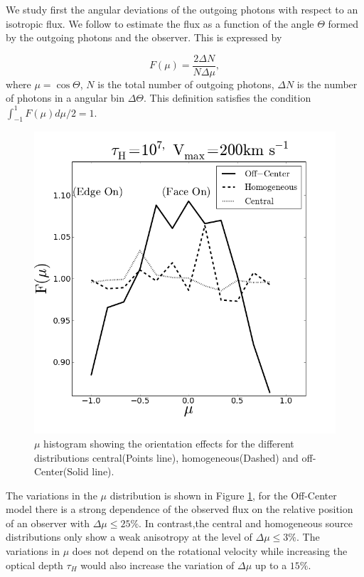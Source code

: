 \documentclass{emulateapj}
\begin{document}
We study first the angular deviations of the outgoing photons with respect
to an isotropic flux. We follow \cite{Zheng2013} to estimate the flux
as a function of the angle $\Theta$ formed by the outgoing photons and
the observer. This is expressed by 

\begin{equation}
F(\mu) = \frac{2\Delta N}{N\Delta \mu}, 
\end{equation} 
%
where $\mu=\cos\Theta$, $N$ is the total number of outgoing photons,
$\Delta N$ is the number of photons in a angular bin $\Delta
\Theta$. This definition satisfies the condition
$\int_{-1}^{1}F(\mu)d\mu/2=1$.  

\begin{figure}
  \includegraphics[scale=0.35]{muhisto.png}
  \caption{$\mu$ histogram showing the orientation effects for the different
  distributions central(Points line), homogeneous(Dashed) and off-Center(Solid line).  
    \label{fig:muhisto}} 
\end{figure}

The variations in the $\mu$ distribution is shown in Figure \ref{fig:muhisto},
for the Off-Center model there is a strong dependence of the 
observed flux on the relative position of an observer with $\Delta\mu\leq 25\%$.
In contrast,the central and homogeneous source distributions only show a 
weak anisotropy at the level of $\Delta\mu\leq 3\%$. The variations
in $\mu$ does not depend on the rotational velocity while increasing the optical depth $\tau_{H}$
would also increase the variation of $\Delta\mu$ up to a $15\%$.
\end{document}
